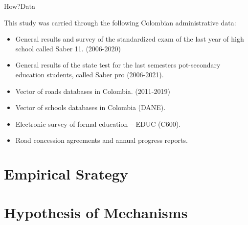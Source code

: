 \documentclass[9pt]{beamer}
\begin{document}
\begin{frame}{How?}{Data}
\label{data}

\justifying 

This study was carried through the following Colombian administrative data:

        \begin{itemize}
            \justifying 
        \item General results and survey of the standardized exam of the last year of high school called Saber 11. (2006-2020) \hyperlink{education}{}\label{contribution} %
        \item General results of the state test for the last semesters pot-secondary education students, called Saber pro (2006-2021).  %
        \item Vector of roads databases in Colombia. (2011-2019)
        \item Vector of schools databases in Colombia (DANE).  
        \item  Electronic survey of formal education – EDUC (C600).     
        \item  Road concession agreements and annual progress reports.
    \end{itemize}
 

\end{frame}
\section{Empirical Srategy}

 \section{Hypothesis of Mechanisms}


 
\end{document}
